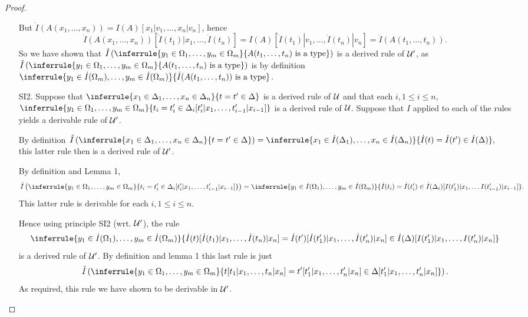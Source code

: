 \begin{proof}
\begin{enumerate}
        But $\dot I(A(x_1,\ldots,x_n))=I(A)[x_1|v_1,\ldots,x_n|v_n]$, hence
        \[\dot I(A(x_1,\ldots,x_n))[\dot I(t_1)|x_1,\ldots,\dot I(t_n)] = I(A)[\dot I(t_1)|v_1,\ldots,\dot I(t_n)|v_n] = \dot I(A(t_1,\ldots,t_n)).\]
        So we have shown that $\hat I\left(\inferrule{y_1\in\Omega_1,\ldots,y_m\in\Omega_m}{A(t_1,\ldots,t_n)\isatype}\right)$ is a derived rule of $\thU'$, as $\hat I\left(\inferrule{y_1\in\Omega_1,\ldots,y_m\in\Omega_m}{A(t_1,\ldots,t_n)\isatype}\right)$ is by definition $\inferrule{y_1\in\dot I(\Omega_m),\ldots,y_m\in\dot I(\Omega_m)}{\dot I(A(t_1,\ldots,t_n))\isatype}$.

      \item[SI2.] Suppose that $\inferrule{x_1\in\Delta_1,\ldots,x_n\in\Delta_n}{t=t'\in\Delta}$ is a derived rule of $\mathcal{U}$ and that each $i,1\leq i\leq n,$ $\inferrule{y_1\in\Omega_1,\ldots,y_m\in\Omega_m}{t_i=t_i'\in\Delta_i[t_i'|x_1,\ldots,t_{i-1}'|x_{i-1}]}$ is a derived rule of $\mathcal{U}$.
        Suppose that $\hat I$ applied to each of the rules yields a derivable rule of $\thU'$.

        By definition $\hat I\left(\inferrule{x_1\in\Delta_1,\ldots,x_n\in\Delta_n}{t=t'\in\Delta}\right) = \inferrule{x_1\in\dot I(\Delta_1),\ldots,x_n\in\dot I(\Delta_n)}{\dot I(t)=\dot I(t')\in\dot I(\Delta)},$ this latter rule then is a derived rule of $\thU'$.

        By definition and Lemma 1,
        \[\hat I\left (\inferrule{y_1\in\Omega_1,\ldots,y_m\in\Omega_m}{t_i=t_i'\in\Delta_i[t_i'|x_1,\ldots,t_{i-1}'|x_{i-1}]}\right)
        =\inferrule{y_1\in\dot I(\Omega_1),\ldots,y_m\in\dot I(\Omega_m)}{\dot I(t_i) = \dot I(t_i')\in\dot I(\Delta_i)[I(t_1')|x_1,\ldots I(t_{i-1}')|x_{i-1}]}.\]
        This latter rule is derivable for each $i,1\leq i\leq n$.

        Hence using principle SI2 (wrt. $\thU'$), the rule
        \[\inferrule{y_1\in\dot I(\Omega_1),\ldots,y_m\in\dot I(\Omega_m)}{\dot I(t)[\dot I(t_1)|x_1,\ldots,\dot I(t_n)|x_n] = \dot I(t')[\dot I(t_1')|x_1,\ldots,\dot I(t_n')|x_n]\in\dot I(\Delta)[I(t_1')|x_1,\ldots,I(t_n')|x_n]}\]
        is a derived rule of $\thU'$.
        By definition and lemma 1 this last rule is just
        \[\hat I\left(\inferrule{y_1\in\Omega_1,\ldots,y_m\in\Omega_m}{t[t_1|x_1,\ldots,t_n|x_n]=t'[t_1'|x_1,\ldots,t_n'|x_n]\in\Delta[t_1'|x_1,\ldots,t_n'|x_n]}\right).\]
        As required, this rule we have shown to be derivable in $\thU'$.
    \end{enumerate}
  \end{proof}

